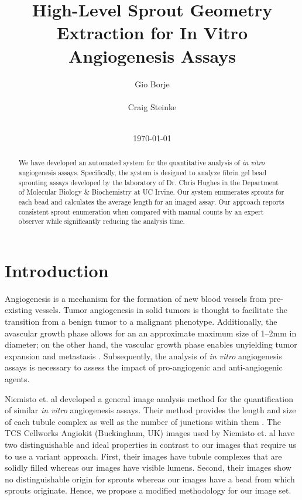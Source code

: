 \documentclass{sig-alternate}
\newcommand{\invitro}{\emph{in vitro} }
\begin{document}
\title{High-Level Sprout Geometry Extraction for In Vitro Angiogenesis Assays}
\author{
	\alignauthor Gio Borje \\
		 \\
	\alignauthor Craig Steinke \\
		 \\
}
\date{\today}
\maketitle

\begin{abstract}
	We have developed an automated system for the quantitative analysis of
	\invitro angiogenesis assays. Specifically, the system is designed to
	analyze fibrin gel bead sprouting assays developed by the laboratory of
	Dr. Chris Hughes in the Department of Molecular Biology \& Biochemistry
	at UC Irvine. Our system enumerates sprouts for each bead and
	calculates the average length for an imaged assay. Our approach reports
	consistent sprout enumeration when compared with manual counts by an
	expert observer while significantly reducing the analysis time.
\end{abstract}

\section{Introduction} %
\label{sec:Introduction}
	Angiogenesis is a mechanism for the formation of new blood vessels
	from pre-existing vessels. Tumor angiogenesis in solid tumors is
	thought to facilitate the transition from a benign tumor to a
	malignant phenotype. Additionally, the avascular growth phase allows
	for an an approximate maximum size of 1--2mm in diameter; on the other
	hand, the vascular growth phase enables unyielding tumor expansion
	and metastasis \cite{kerbel99}. Subsequently, the analysis of
	\invitro angiogenesis assays is necessary to assess the impact of
	pro-angiogenic and anti-angiogenic agents.

	Niemisto et. al developed a general image analysis method for the
	quantification of similar \invitro angiogenesis assays. Their method
	provides the length and size of each tubule complex as well as the number
	of junctions within them \cite{niemisto05}. The TCS Cellworks Angiokit
	(Buckingham, UK) images used by Niemisto et. al have two distinguishable
	and ideal properties in contrast to our images that require us to use a
	variant approach. First, their images have tubule complexes that are
	solidly filled whereas our images have visible lumens. Second, their images
	show no distinguishable origin for sprouts whereas our images have a bead
	from which sprouts originate. Hence, we propose a modified methodology for
	our image set.
\end{document}
